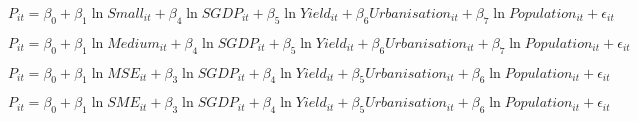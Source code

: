 \documentclass [12pt]{article}
\begin{document}
\begin{equation}\label{8}
   {P_{it}} = \beta_0 + \beta_1\ln{Small}_{it} + \beta_4\ln{SGDP_{it}} + \beta_5\ln{Yield_{it}} + \beta_6Urbanisation_{it} + \beta_7\ln{Population_{it}} + \epsilon_{it}
\end{equation}

\begin{equation}\label{9}
   {P_{it}} = \beta_0+ \beta_1\ln{Medium}_{it} + \beta_4\ln{SGDP_{it}} + \beta_5\ln{Yield_{it}} + \beta_6Urbanisation_{it} + \beta_7\ln{Population_{it}} + \epsilon_{it}
\end{equation}

\begin{equation}\label{10}
P_{it} = \beta_0 + \beta_1\ln{{MSE}}_{it} + \beta_3\ln{SGDP_{it}} + \beta_4\ln{Yield_{it}} + \beta_5Urbanisation_{it} + \beta_6\ln{Population_{it}}+ \epsilon_{it}     
\end{equation}

\begin{equation}\label{11}
P_{it} = \beta_0 + \beta_1\ln{{SME}}_{it} + \beta_3\ln{SGDP_{it}} + \beta_4\ln{Yield_{it}} + \beta_5Urbanisation_{it} + \beta_6\ln{Population_{it}}+ \epsilon_{it}     
\end{equation}
\end{document}
